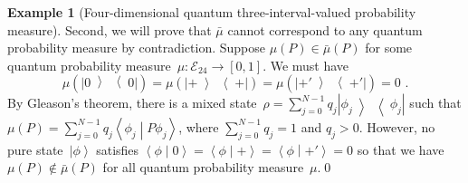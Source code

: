 \documentclass[english,reprint, aps, prl,superscriptaddress, showpacs,
showkeys]{revtex4-1}
\theoremstyle{plain}
\theoremstyle{definition}
\newtheorem{example}[thm]{Example}
\newcommand{\events}{\ensuremath{\mathcal{E}}}
\newcommand{\ket}[1]{{\left\vert{#1}\right\rangle}}
\newcommand{\op}[2]{\ensuremath{\left\vert{#1}\middle\rangle\middle\langle{#2}\right\vert}}
\newcommand{\proj}[1]{\op{#1}{#1}}
\newcommand{\ps}{\texttt{+}}
\newcommand{\ip}[2]{\ensuremath{\left\langle{#1}\middle\vert{#2}\right\rangle}}
\begin{document}
\begin{example}[Four-dimensional quantum three-interval-valued probability
measure]
Second, we will prove that $\bar{\mu}$ cannot correspond to any quantum
probability measure by contradiction. Suppose $\mu(P)\in\bar{\mu}(P)$
for some quantum probability measure~$\mu:\events_{24}\rightarrow\left[0,1\right]$.
We must have 
\begin{equation}
\mu(\proj{0})=\mu(\proj{\ps})=\mu(\proj{\ps'})=0\textrm{ .}\label{eq:probability-zero-on-states}
\end{equation}
By Gleason's theorem, there is a mixed state~$\rho=\sum_{j=0}^{N-1}q_{j}\proj{\phi_{j}}$
such that $\mu\left(P\right)=\sum_{j=0}^{N-1}q_{j}\ip{\phi_{j}}{P\phi_{j}}$,
where $\sum_{j=0}^{N-1}q_{j}=1$ and $q_{j}>0$. However, no pure
state~$\ket{\phi}$ satisfies $\ip{\phi}{0}=\ip{\phi}{\ps}=\ip{\phi}{\ps'}=0$
so that we have $\mu(P)\notin\bar{\mu}(P)$ for all quantum probability
measure~$\mu$.\qed\end{example}


\end{document}
